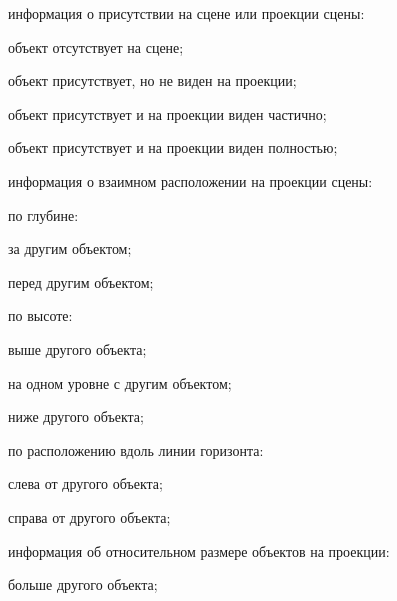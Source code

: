 \begin{textitemize}
    \item информация о присутствии на сцене или проекции сцены:
    \begin{textitemize}
        \item объект отсутствует на сцене;
        \item объект присутствует, но не виден на проекции;
        \item объект присутствует и на проекции виден частично;
        \item объект присутствует и на проекции виден полностью;
    \end{textitemize}
    \item информация о взаимном расположении на проекции сцены:
    \begin{textitemize}
        \item по глубине:
        \begin{textitemize}
            \item за другим объектом;
            \item перед другим объектом;
        \end{textitemize}
    \end{textitemize}
    \begin{textitemize}
        \item по высоте:
        \begin{textitemize}
            \item выше другого объекта;
            \item на одном уровне с другим объектом;
            \item ниже другого объекта;
        \end{textitemize}
    \end{textitemize}
    \begin{textitemize}
        \item по расположению вдоль линии горизонта:
        \begin{textitemize}
            \item слева от другого объекта;
            \item справа от другого объекта;
        \end{textitemize}
    \end{textitemize}
    \item информация об относительном размере объектов на проекции:
    \begin{textitemize}
        \item больше другого объекта;

\end{textitemize}
\end{textitemize}
